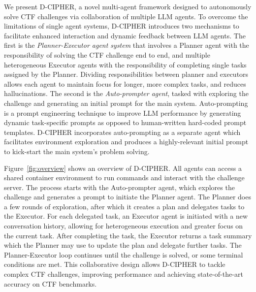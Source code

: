 We present D-CIPHER, a novel multi-agent framework designed to autonomously solve CTF challenges via collaboration of multiple LLM agents. 
To overcome the limitations of single agent systems, D-CIPHER introduces two mechanisms to facilitate enhanced interaction and dynamic feedback between LLM agents.
The first is the \textit{Planner-Executor agent system} that involves a Planner agent with the responsibility of solving the CTF challenge end to end, and multiple heterogeneous Executor agents with the responsibility of completing single tasks assigned by the Planner.
Dividing responsibilities between planner and executors allows each agent to maintain focus for longer, more complex tasks, and reduces hallucinations.
The second is the \textit{Auto-prompter agent}, tasked with exploring the challenge and generating an initial prompt for the main system.
Auto-prompting is a prompt engineering technique to improve LLM performance by generating dynamic task-specific prompts as opposed to human-written hard-coded prompt templates. D-CIPHER incorporates auto-prompting as a separate agent which facilitates environment exploration and produces a highly-relevant initial prompt to kick-start the main system's problem solving.

Figure~\ref{fig:overview} shows an overview of D-CIPHER. All  agents can access a shared container environment to run commands and interact with the challenge server.
The process starts with the Auto-prompter agent, which explores the challenge and generates a prompt to initiate the Planner agent. The Planner does a few rounds of exploration, after which it creates a plan and delegates tasks to the Executor. For each delegated task, an Executor agent is initiated with a new conversation history, allowing for heterogeneous execution and greater focus on the current task. After completing the task, the Executor returns a task summary which the Planner may use to update the plan and delegate further tasks. The Planner-Executor loop continues until the challenge is solved, or some terminal conditions are met.
This collaborative design allows D-CIPHER to tackle complex CTF challenges, improving performance and achieving state-of-the-art accuracy on CTF benchmarks.

